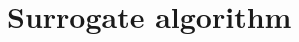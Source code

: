 \documentclass[%
prx,
reprint,
superscriptaddress,
nofootinbib,
 amsmath,amssymb,
 aps,
floatfix,
]{revtex4-2}
\let\oldalign\align
\let\oldendalign\endalign
\renewenvironment{align}{%
    \linenomathNonumbers\oldalign%
    }{%
    \oldendalign\endlinenomath%
    }
\begin{document}


\section{Surrogate algorithm} \label{sapp:details_alg}
\end{document}
